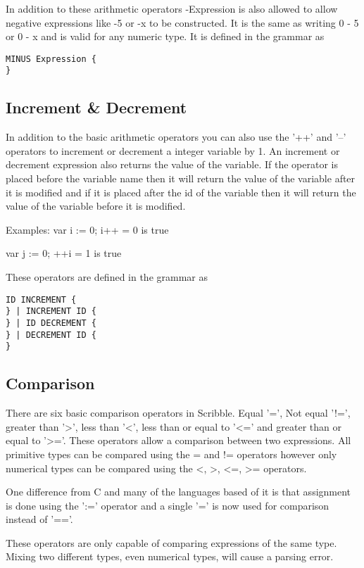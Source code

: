 \documentclass[]{final_report}
\begin{document}
In addition to these arithmetic operators -Expression is also allowed to allow negative expressions like -5 or -x to be constructed. It is the same as writing 0 - 5 or 0 - x and is valid for any numeric type. It is defined in the grammar as 

\begin{verbatim}
MINUS Expression {
}
\end{verbatim}

\subsection{Increment \& Decrement}

In addition to the basic arithmetic operators you can also use the '++' and '--' operators to increment or decrement a integer variable by 1. An increment or decrement expression also returns the value of the variable. If the operator is placed before the variable name then it will return the value of the variable after it is modified and if it is placed after the id of the variable then it will return the value of the variable before it is modified.

Examples:
var i := 0;
i++ = 0 is true

var j := 0;
++i = 1 is true

These operators are defined in the grammar as
\begin{verbatim}
ID INCREMENT {
} | INCREMENT ID {
} | ID DECREMENT {
} | DECREMENT ID {
}
\end{verbatim}

\subsection{Comparison}

There are six basic comparison operators in Scribble. Equal '=', Not equal '!=', greater than '>', less than '<', less than or equal to '<=' and greater than or equal to '>='. These operators allow a comparison between two expressions. All primitive types can be compared using the = and != operators however only numerical types can be compared using the <, >, <=, >= operators.

One difference from C and many of the languages based of it is that assignment is done using the ':=' operator and a single '=' is now used for comparison instead of '=='.

These operators are only capable of comparing expressions of the same type. Mixing two different types, even numerical types, will cause a parsing error.
\end{document}
